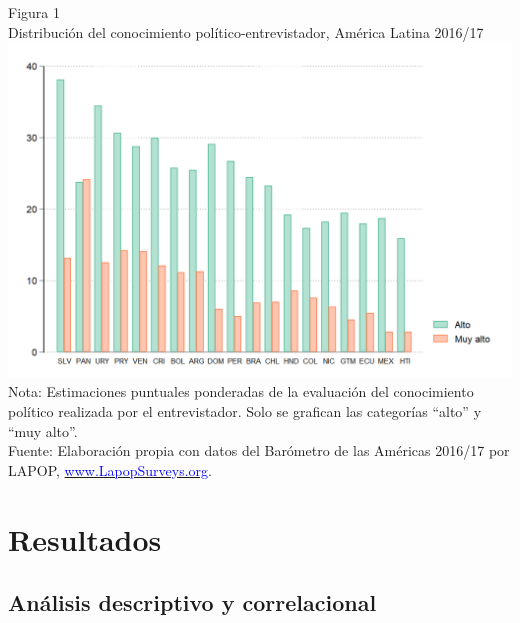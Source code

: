 \documentclass[a4paper]{tufte-handout}
\begin{document}
\begin{marginfigure}
  \centering
  \smallskip\noindent\small Figura 1 \\ Distribución del conocimiento político-entrevistador, América Latina 2016/17
  \includegraphics[width=.95\linewidth]{figures/conocim}
  \\ \smallskip\noindent\scriptsize Nota: Estimaciones puntuales ponderadas de la evaluación del conocimiento político realizada por el entrevistador. Solo se grafican las categorías “alto” y “muy alto”.\\
  Fuente: Elaboración propia con datos del Barómetro de las Américas 2016/17 por LAPOP, \href{https://www.vanderbilt.edu/lapop/}{\textcolor{blue}{www.LapopSurveys.org}}.
\end{marginfigure}

\section[Resultados] {{\normalfont Resultados}}

\subsection[Análisis descriptivo y correlacional] {Análisis descriptivo y correlacional}

\end{document}
